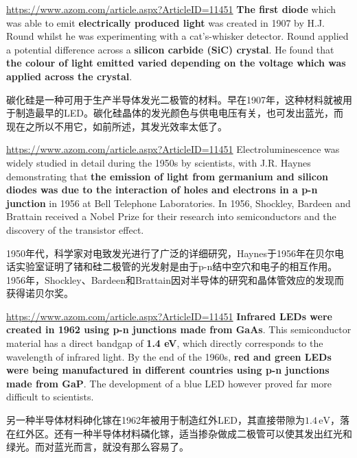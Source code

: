 \documentclass{beamer}
\newenvironment{slide}{
    \begin{frame}{\bfseries{\sectiontitle}}
}{
    \end{frame}
}
\begin{document}
\begin{slide}{\url{https://www.azom.com/article.aspx?ArticleID=11451}}
    \textbf{The first diode} which was able to emit \textbf{electrically produced light} was created in 1907 by H.J. Round whilst he was experimenting with a cat's-whisker detector. Round applied a potential difference across a \textbf{silicon carbide (SiC) crystal}. He found that \textbf{the colour of light emitted varied depending on the voltage which was applied across the crystal}.
    \bigskip

    碳化硅是一种可用于生产半导体发光二极管的材料。早在1907年，这种材料就被用于制造最早的LED。碳化硅晶体的发光颜色与供电电压有关，也可发出蓝光，而现在之所以不用它，如前所述，其发光效率太低了。
\end{slide}

\begin{slide}{\url{https://www.azom.com/article.aspx?ArticleID=11451}}
Electroluminescence was widely studied in detail during the 1950s by scientists, with J.R. Haynes demonstrating that \textbf{the emission of light from germanium and silicon diodes was due to the interaction of holes and electrons in a p-n junction} in 1956 at Bell Telephone Laboratories. In 1956, Shockley, Bardeen and Brattain received a Nobel Prize for their research into semiconductors and the discovery of the transistor effect.
\bigskip

1950年代，科学家对电致发光进行了广泛的详细研究，Haynes于1956年在贝尔电话实验室证明了锗和硅二极管的光发射是由于p-n结中空穴和电子的相互作用。1956年，Shockley、Bardeen和Brattain因对半导体的研究和晶体管效应的发现而获得诺贝尔奖。

\end{slide}

\begin{slide}{\url{https://www.azom.com/article.aspx?ArticleID=11451}}
    \textbf{Infrared LEDs were created in 1962 using p-n junctions made from GaAs}. This semiconductor material has a direct bandgap of \textbf{1.4 eV}, which directly corresponds to the wavelength of infrared light. By the end of the 1960s, \textbf{red and green LEDs were being manufactured in different countries using p-n junctions made from GaP}. The development of a blue LED however proved far more difficult to scientists.
    \bigskip

    另一种半导体材料砷化镓在1962年被用于制造红外LED，其直接带隙为$1.4\,\mathrm{eV}$，落在红外区。还有一种半导体材料磷化镓，适当掺杂做成二极管可以使其发出红光和绿光。而对蓝光而言，就没有那么容易了。
\end{slide}
\end{document}
